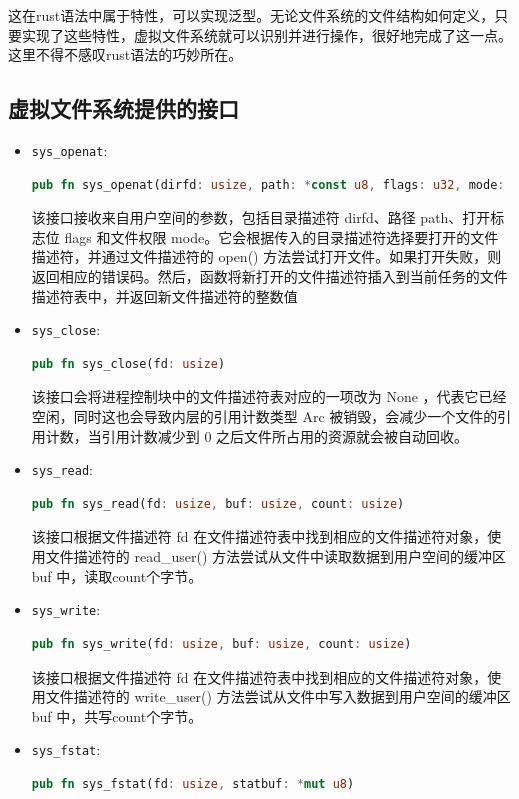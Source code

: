 这在rust语法中属于特性，可以实现泛型。无论文件系统的文件结构如何定义，只要实现了这些特性，虚拟文件系统就可以识别并进行操作，很好地完成了这一点。这里不得不感叹rust语法的巧妙所在。

\subsection{虚拟文件系统提供的接口}

\begin{itemize}
	\item \texttt{sys\_openat}: 
	\begin{lstlisting}[language=rust]
	pub fn sys_openat(dirfd: usize, path: *const u8, flags: u32, mode: u32)
	\end{lstlisting}
	该接口接收来自用户空间的参数，包括目录描述符 dirfd、路径 path、打开标志位 flags 和文件权限 mode。它会根据传入的目录描述符选择要打开的文件描述符，并通过文件描述符的 open() 方法尝试打开文件。如果打开失败，则返回相应的错误码。然后，函数将新打开的文件描述符插入到当前任务的文件描述符表中，并返回新文件描述符的整数值
	\item \texttt{sys\_close}: 
	\begin{lstlisting}[language=rust]
	pub fn sys_close(fd: usize)
	\end{lstlisting}
	该接口会将进程控制块中的文件描述符表对应的一项改为 None ，代表它已经空闲，同时这也会导致内层的引用计数类型 Arc 被销毁，会减少一个文件的引用计数，当引用计数减少到 0 之后文件所占用的资源就会被自动回收。
	\item \texttt{sys\_read}: 
	\begin{lstlisting}[language=rust]
	pub fn sys_read(fd: usize, buf: usize, count: usize)
	\end{lstlisting}
	该接口根据文件描述符 fd 在文件描述符表中找到相应的文件描述符对象，使用文件描述符的 read\_user() 方法尝试从文件中读取数据到用户空间的缓冲区 buf 中，读取count个字节。
	\item \texttt{sys\_write}: 
	\begin{lstlisting}[language=rust]
	pub fn sys_write(fd: usize, buf: usize, count: usize)
	\end{lstlisting}
	该接口根据文件描述符 fd 在文件描述符表中找到相应的文件描述符对象，使用文件描述符的 write\_user() 方法尝试从文件中写入数据到用户空间的缓冲区 buf 中，共写count个字节。
	\item \texttt{sys\_fstat}: 
	\begin{lstlisting}[language=rust]
	pub fn sys_fstat(fd: usize, statbuf: *mut u8)
	\end{lstlisting}

\end{itemize}
